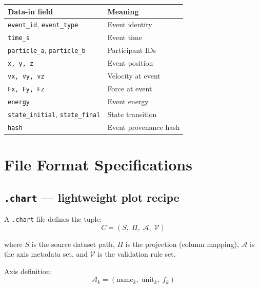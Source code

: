 \documentclass[11pt, a4paper, oneside]{article}
\newcommand{\Proj}{\Pi}                  %
\newcommand{\Val}{\mathcal{V}}           %
\begin{document}
\begin{center}
\begin{tabular}{ll}
  \toprule
  Data-in field & Meaning \\
  \midrule
  \texttt{event\_id}, \texttt{event\_type} & Event identity \\
  \texttt{time\_s}                         & Event time \\
  \texttt{particle\_a}, \texttt{particle\_b} & Participant IDs \\
  \texttt{x, y, z}                         & Event position \\
  \texttt{vx, vy, vz}                      & Velocity at event \\
  \texttt{Fx, Fy, Fz}                      & Force at event \\
  \texttt{energy}                          & Event energy \\
  \texttt{state\_initial}, \texttt{state\_final} & State transition \\
  \texttt{hash}                            & Event provenance hash \\
  \bottomrule
\end{tabular}
\end{center}

\section{File Format Specifications}
\label{sec:formats}

\subsection{\texttt{.chart} --- lightweight plot recipe}

A \texttt{.chart} file defines the tuple:
\begin{equation}
  C = (S,\; \Proj,\; \mathcal{A},\; \Val)
  \label{eq:chart_tuple}
\end{equation}

where $S$ is the source dataset path, $\Proj$ is the projection (column
mapping), $\mathcal{A}$ is the axis metadata set, and $\Val$ is the
validation rule set.

Axis definition:
\begin{equation}
  \mathcal{A}_k = (\mathrm{name}_k,\; \mathrm{unit}_k,\; f_k)
  \label{eq:axis}
\end{equation}
\end{document}
